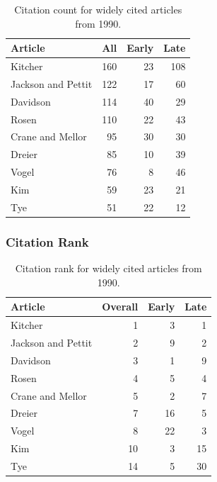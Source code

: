 \documentclass[
  10pt,
  letterpaper,
  DIV=11,
  numbers=noendperiod,
  twoside]{scrartcl}
\begin{document}
\begin{longtable}[]{@{}lrrr@{}}

\caption{\label{tbl-citation-count-1990}Citation count for widely cited
articles from 1990.}

\tabularnewline

\toprule\noalign{}
Article & All & Early & Late \\
\midrule\noalign{}
\endhead
\bottomrule\noalign{}
\endlastfoot
Kitcher & 160 & 23 & 108 \\
Jackson and Pettit & 122 & 17 & 60 \\
Davidson & 114 & 40 & 29 \\
Rosen & 110 & 22 & 43 \\
Crane and Mellor & 95 & 30 & 30 \\
Dreier & 85 & 10 & 39 \\
Vogel & 76 & 8 & 46 \\
Kim & 59 & 23 & 21 \\
Tye & 51 & 22 & 12 \\

\end{longtable}

\subsubsection*{Citation Rank}\label{citation-rank-14}

\begin{longtable}[]{@{}lrrr@{}}

\caption{\label{tbl-citation-rank-1990}Citation rank for widely cited
articles from 1990.}

\tabularnewline

\toprule\noalign{}
Article & Overall & Early & Late \\
\midrule\noalign{}
\endhead
\bottomrule\noalign{}
\endlastfoot
Kitcher & 1 & 3 & 1 \\
Jackson and Pettit & 2 & 9 & 2 \\
Davidson & 3 & 1 & 9 \\
Rosen & 4 & 5 & 4 \\
Crane and Mellor & 5 & 2 & 7 \\
Dreier & 7 & 16 & 5 \\
Vogel & 8 & 22 & 3 \\
Kim & 10 & 3 & 15 \\
Tye & 14 & 5 & 30 \\

\end{longtable}
\end{document}
